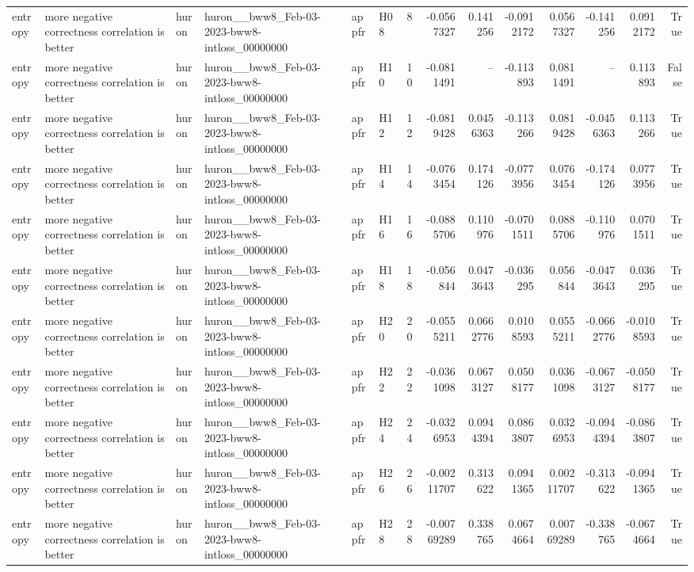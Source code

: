 \begin{longtable}{llllllrrrrrrrr}
entropy & more negative correctness correlation is better & huron & huron\_\_bww8\_Feb-03-2023-bww8-intloss\_00000000 & appfr & H08 & 8 & -0.0567327 & 0.141256 & -0.0912172 & 0.0567327 & -0.141256 & 0.0912172 & True \\
entropy & more negative correctness correlation is better & huron & huron\_\_bww8\_Feb-03-2023-bww8-intloss\_00000000 & appfr & H10 & 10 & -0.0811491 & -- & -0.113893 & 0.0811491 & -- & 0.113893 & False \\
entropy & more negative correctness correlation is better & huron & huron\_\_bww8\_Feb-03-2023-bww8-intloss\_00000000 & appfr & H12 & 12 & -0.0819428 & 0.0456363 & -0.113266 & 0.0819428 & -0.0456363 & 0.113266 & True \\
entropy & more negative correctness correlation is better & huron & huron\_\_bww8\_Feb-03-2023-bww8-intloss\_00000000 & appfr & H14 & 14 & -0.0763454 & 0.174126 & -0.0773956 & 0.0763454 & -0.174126 & 0.0773956 & True \\
entropy & more negative correctness correlation is better & huron & huron\_\_bww8\_Feb-03-2023-bww8-intloss\_00000000 & appfr & H16 & 16 & -0.0885706 & 0.110976 & -0.0701511 & 0.0885706 & -0.110976 & 0.0701511 & True \\
entropy & more negative correctness correlation is better & huron & huron\_\_bww8\_Feb-03-2023-bww8-intloss\_00000000 & appfr & H18 & 18 & -0.056844 & 0.0473643 & -0.036295 & 0.056844 & -0.0473643 & 0.036295 & True \\
entropy & more negative correctness correlation is better & huron & huron\_\_bww8\_Feb-03-2023-bww8-intloss\_00000000 & appfr & H20 & 20 & -0.0555211 & 0.0662776 & 0.0108593 & 0.0555211 & -0.0662776 & -0.0108593 & True \\
entropy & more negative correctness correlation is better & huron & huron\_\_bww8\_Feb-03-2023-bww8-intloss\_00000000 & appfr & H22 & 22 & -0.0361098 & 0.0673127 & 0.0508177 & 0.0361098 & -0.0673127 & -0.0508177 & True \\
entropy & more negative correctness correlation is better & huron & huron\_\_bww8\_Feb-03-2023-bww8-intloss\_00000000 & appfr & H24 & 24 & -0.0326953 & 0.0944394 & 0.0863807 & 0.0326953 & -0.0944394 & -0.0863807 & True \\
entropy & more negative correctness correlation is better & huron & huron\_\_bww8\_Feb-03-2023-bww8-intloss\_00000000 & appfr & H26 & 26 & -0.00211707 & 0.313622 & 0.0941365 & 0.00211707 & -0.313622 & -0.0941365 & True \\
entropy & more negative correctness correlation is better & huron & huron\_\_bww8\_Feb-03-2023-bww8-intloss\_00000000 & appfr & H28 & 28 & -0.00769289 & 0.338765 & 0.0674664 & 0.00769289 & -0.338765 & -0.0674664 & True \\

\end{longtable}
